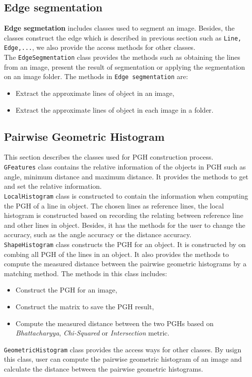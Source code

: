 \subsection{Edge segmentation }
\textbf{Edge segmetation} includes classes used to segment an image. Besides, the classes construct the edge which is described in previous section such as \texttt{Line, Edge,...}, we also provide the access methods for other classes.\\[0.2cm]
The \texttt{EdgeSegmentation} class provides the methods such as obtaining the lines from an image, present the result of segmentation or applying the segmentation on an image folder. The methods in \texttt{Edge segmentation} are:
\begin{itemize}
\item Extract the approximate lines of object in an image,
\item Extract the approximate lines of object in each image in a folder.
\end{itemize}
\subsection{Pairwise Geometric Histogram}
This section describes the classes used for PGH construction process.\\[0.2cm]
\texttt{GFeatures} class contains the relative information of the objects in PGH such as angle, minimum distance and maximum distance. It provides the methods to get and set the relative information.\\[0.2cm]
\texttt{LocalHistogram} class is constructed to contain the information when computing the PGH of a line in object. The chosen lines as reference lines, the local histogram is constructed based on recording the relating between reference line and other lines in object. Besides, it has the methods for the user to change the accuracy, such as the angle accuracy or the distance accuracy.\\[0.2cm]
\texttt{ShapeHistogram} class constructs the PGH for an object. It is constructed by on combing all PGH of the lines in an object. It also provides the methods to compute the measured distance between the pairwise geometric histograms by a matching method. The methods in this class includes:
\begin{itemize}
\item Construct the PGH for an image,
\item Construct the matrix to save the PGH result,
\item Compute the measured distance between the two PGHs based on \textit{Bhattacharyya}, \textit{Chi-Squared} or \textit{Intersection} metric.
\end{itemize}
\texttt{GeometricHistogram} class provides the access ways for other classes. By usign this class, user can compute the pairwise geometric histogram of an image and calculate the distance between the pairwise geometric histograms.
